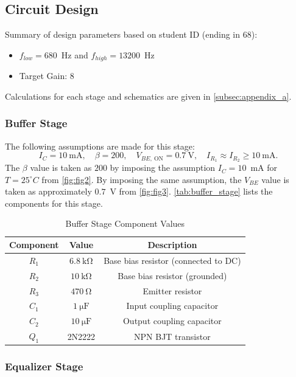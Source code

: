 \documentclass[12pt, a4paper]{article}
\numberwithin{table}{section}
\numberwithin{figure}{section}
\begin{document}
\subsection{Circuit Design}

Summary of design parameters based on student ID (ending in $68$):
\begin{itemize}
    \item $f_{low} = 680$~Hz and $f_{high} = 13200$~Hz
    \item Target Gain: $8$ 
\end{itemize}

Calculations for each stage and schematics are given in \autoref{subsec:appendix_a}.

\subsubsection{Buffer Stage}

The following assumptions are made for this stage:
\[I_C=10~\mathrm{mA},\quad\beta=200,\quad V_{BE,~\text{ON}}=0.7~\text{V},\quad I_{R_1}\approx I_{R_2}\ge10~\mathrm{mA}.\]
The $\beta$ value is taken as $200$ by imposing the assumption $I_C=10$~mA for $T=25^\circ C$ from \autoref{fig:fig2}. By imposing the same assumption, the $V_{BE}$ value is taken as approximately $0.7$~V from \autoref{fig:fig3}. \autoref{tab:buffer_stage} lists the components for this stage.

\begin{table}[H]
\centering
\caption{Buffer Stage Component Values}
\begin{tabular}{|c|c|c|}
\hline
\textbf{Component} & \textbf{Value} & \textbf{Description} \\ \hline
$R_1$ & $6.8~\mathrm{k\Omega}$ & Base bias resistor (connected to DC) \\ \hline
$R_2$ & $10~\mathrm{k\Omega}$ & Base bias resistor (grounded)\\ \hline
$R_3$ & $470~\mathrm{\Omega}$ & Emitter resistor \\ \hline
$C_1$ & $1~\mathrm{\mu F}$ & Input coupling capacitor \\ \hline
$C_2$ & $10~\mathrm{\mu F}$ & Output coupling capacitor \\ \hline
$Q_1$ & 2N2222 & NPN BJT transistor \\ \hline
\end{tabular}
\label{tab:buffer_stage}
\end{table}

\subsubsection{Equalizer Stage}
\end{document}
